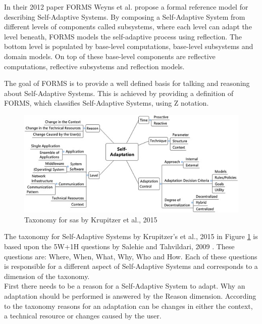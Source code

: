 \par
In their 2012 paper FORMS \cite{FORMS} Weyns et al. propose a formal reference model for describing Self-Adaptive Systems.
By composing a Self-Adaptive System from different levels of components called subsystems,
where each level can adapt the level beneath, FORMS models the self-adaptive process using reflection.
The bottom level is populated by base-level computations, base-level subsystems and domain models.
On top of these base-level components are reflective computations, reflective subsystems and reflection models.

The goal of FORMS is to provide a well defined basis for talking and reasoning about Self-Adaptive Systems.
This is achieved by providing a definition of FORMS, which classifies Self-Adaptive Systems, using Z notation.


\begin{figure}[hbt!]
    \includegraphics[width=\textwidth]{images/KrupitzerTaxonomy.jpg}
    \caption{Taxonomy for \acrlong{sas} by Krupitzer et al., 2015 \cite*{SurveyOnEngineeringApproaches}}
    \label{fig:KrupitzerTaxonomy}
\end{figure}

\par
The taxonomy for Self-Adaptive Systems by Krupitzer's et al., 2015 \cite*{SurveyOnEngineeringApproaches} in Figure \ref{fig:KrupitzerTaxonomy}
is based upon the 5W+1H questions by Salehie and Tahvildari, 2009 \cite*{LandscapeAndResearchChallenges}.
These questions are: Where, When, What, Why, Who and How.
Each of these questions is responsible for a different aspect of Self-Adaptive Systems and corresponds to a dimension of the taxonomy. \\

First there needs to be a reason for a Self-Adaptive System to adapt.
Why an adaptation should be performed is answered by the Reason dimension.
According to the taxonomy reasons for an adaptation can be changes in either the context, a technical resource or changes caused by the user. \\

